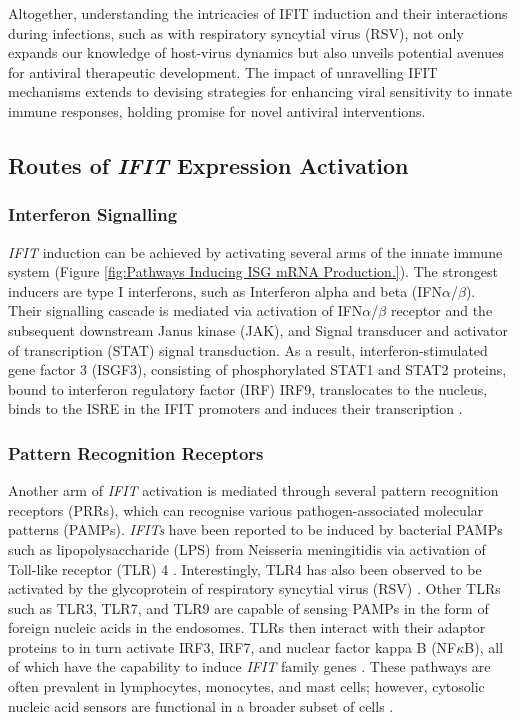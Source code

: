Altogether, understanding the intricacies of IFIT induction and their interactions during infections, such as with respiratory syncytial virus (RSV), not only expands our knowledge of host-virus dynamics but also unveils potential avenues for antiviral therapeutic development. The impact of unravelling IFIT mechanisms extends to devising strategies for enhancing viral sensitivity to innate immune responses, holding promise for novel antiviral interventions.

\subsection{Routes of \textit{IFIT} Expression Activation} \label{subsec:Routes of IFIT Expression Activation}
\subsubsection{Interferon Signalling} \label{Interferon Signalling}
\textit{IFIT} induction can be achieved by activating several arms of the innate immune system (Figure \ref{fig:Pathways Inducing ISG mRNA Production.}). The strongest inducers are type I interferons, such as Interferon alpha and beta (IFN\(\alpha\)/\(\beta\)). Their signalling cascade is mediated via activation of IFN\(\alpha\)/\(\beta\) receptor and the subsequent downstream Janus kinase (JAK), and Signal transducer and activator of transcription (STAT) signal transduction. As a result, interferon-stimulated gene factor 3 (ISGF3), consisting of phosphorylated STAT1 and STAT2 proteins, bound to interferon regulatory factor (IRF) IRF9, translocates to the nucleus, binds to the ISRE in the IFIT promoters and induces their transcription \cite{Der1998IdentificationArrays, Mesev2019DecodingInfection, Schoggins2011Interferon-stimulatedFunctions}. 

\subsubsection{Pattern Recognition Receptors} \label{Pattern Recognition Receptors}
Another arm of \textit{IFIT} activation is mediated through several pattern recognition receptors (PRRs), which can recognise various pathogen-associated molecular patterns (PAMPs). \textit{IFITs} have been reported to be induced by bacterial PAMPs such as lipopolysaccharide (LPS) from Neisseria meningitidis via activation of Toll-like receptor (TLR) 4 \cite{Zhou2013InterferonDefense.}. Interestingly, TLR4 has also been observed to be activated by the glycoprotein of respiratory syncytial virus (RSV) \cite{Funchal2015RespiratoryNeutrophils}. Other TLRs such as TLR3, TLR7, and TLR9 are capable of sensing PAMPs in the form of foreign nucleic acids in the endosomes. TLRs then interact with their adaptor proteins to in turn activate IRF3, IRF7, and nuclear factor kappa B (NF\(\kappa\)B), all of which have the capability to induce \textit{IFIT} family genes \cite{Diamond2013TheProteins}. These pathways are often prevalent in lymphocytes, monocytes, and mast cells; however, cytosolic nucleic acid sensors are functional in a broader subset of cells \cite{Ablasser2011WhereFit}.

